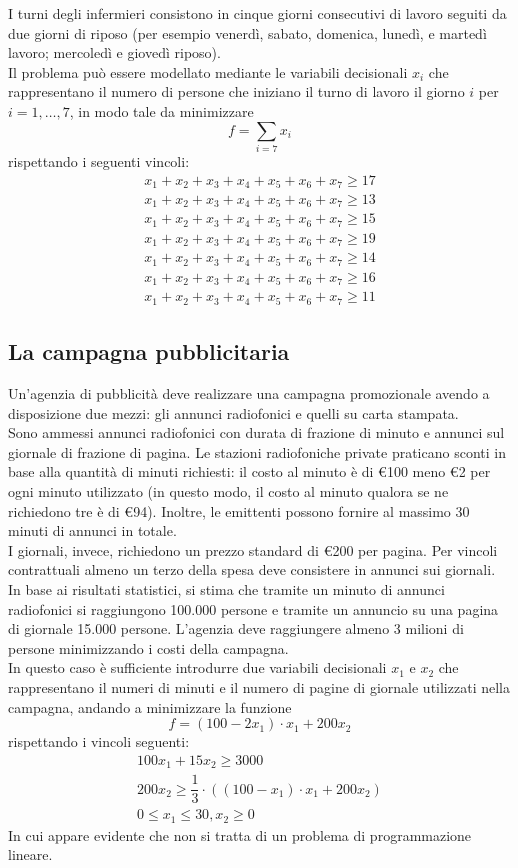 \documentclass[a4paper]{extarticle}
\begin{document}
\vspace{1em}
\noindent
I turni degli infermieri consistono in cinque giorni consecutivi di lavoro seguiti da due giorni di riposo (per esempio venerdì, sabato, domenica, lunedì, e martedì lavoro; mercoledì e giovedì riposo).\\
Il problema può essere modellato mediante le variabili decisionali $x_i$ che rappresentano il numero di persone che iniziano il turno di
lavoro il giorno $i$ per $i = 1,\dots,7$, in modo tale da minimizzare
\[f = \sum_{i=7} x_i\]
rispettando i seguenti vincoli:
\begin{align}
    x_1+x_2+x_3+x_4+x_5+x_6+x_7 \geq 17\\
    x_1+x_2+x_3+x_4+x_5+x_6+x_7 \geq 13\\
    x_1+x_2+x_3+x_4+x_5+x_6+x_7 \geq 15\\
    x_1+x_2+x_3+x_4+x_5+x_6+x_7 \geq 19\\
    x_1+x_2+x_3+x_4+x_5+x_6+x_7 \geq 14\\
    x_1+x_2+x_3+x_4+x_5+x_6+x_7 \geq 16\\
    x_1+x_2+x_3+x_4+x_5+x_6+x_7 \geq 11
\end{align}

\vspace{1em}
\noindent
\subsection{La campagna pubblicitaria}
Un'agenzia di pubblicità deve realizzare una campagna promozionale avendo a disposizione due mezzi: gli annunci radiofonici e quelli su carta stampata.\\
Sono ammessi annunci radiofonici con durata di frazione di minuto e annunci sul giornale di frazione di pagina. Le stazioni radiofoniche private praticano sconti in base alla quantità di minuti richiesti: il costo al minuto è di €100 meno €2 per ogni minuto utilizzato (in questo modo, il costo al minuto qualora se ne richiedono tre è di €94). Inoltre, le emittenti possono fornire al massimo 30 minuti di annunci in totale.\\
I giornali, invece, richiedono un prezzo standard di €200 per pagina. Per vincoli contrattuali almeno un terzo della spesa deve consistere in annunci sui giornali. In base ai risultati statistici, si stima che tramite un minuto di annunci radiofonici si raggiungono 100.000 persone e tramite un annuncio su una pagina di giornale 15.000 persone. L'agenzia deve raggiungere almeno 3 milioni di persone minimizzando i costi della campagna.\\
In questo caso è sufficiente introdurre due variabili decisionali $x_1$ e $x_2$ che rappresentano il numeri di minuti e il numero di pagine di giornale utilizzati nella campagna, andando a minimizzare la funzione
\[f = (100 - 2x_1) \cdot x_1 + 200 x_2\]
rispettando i vincoli seguenti:
\begin{align}
    100 x_1 + 15 x_2 \geq 3000\\
    200 x_2 \geq \dfrac{1}{3} \cdot \left((100-x_1) \cdot x_1 + 200x_2\right)\\
    0 \leq x_1 \leq 30, x_2 \geq 0
\end{align}
In cui appare evidente che non si tratta di un problema di programmazione lineare.
\end{document}
